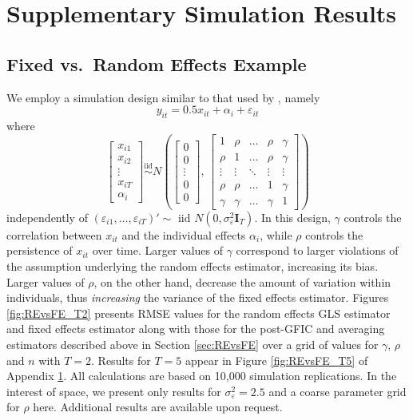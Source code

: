 \section{Supplementary Simulation Results}
\label{sec:simulation_supplement}
\subsection{Fixed vs.\ Random Effects Example}
\label{sec:REvsFEsim}
We employ a simulation design similar to that used by \cite{GuggenbergerRE}, namely
\begin{equation*}
  y_{it} = 0.5 x_{it} + \alpha_i + \varepsilon_{it}
\end{equation*}
where
\[
  \begin{bmatrix}
x_{i1}\\
x_{i2}\\
\vdots\\
x_{iT}\\
\alpha_i
\end{bmatrix}  \overset{\mbox{iid}}{\sim} N \left (
\begin{bmatrix}
0\\
0\\
\vdots\\
0\\
0
\end{bmatrix} , \, 
\begin{bmatrix}
1 & \rho & \ldots & \rho & \gamma\\
\rho & 1 & \ldots & \rho & \gamma\\
\vdots & \vdots&  \ddots & \vdots &\vdots\\
\rho & \rho & \ldots & 1 & \gamma\\
\gamma& \gamma &\ldots& \gamma & 1 
\end{bmatrix}
\right)
\]
independently of $\left( \varepsilon_{i1}, \dots, \varepsilon_{iT} \right)' \sim \mbox{ iid } N(0, \sigma_{\varepsilon}^2 \mathbf{I}_T)$.
In this design, $\gamma$ controls the correlation between $x_{it}$ and the individual effects $\alpha_i$, while $\rho$ controls the persistence of $x_{it}$ over time.
Larger values of $\gamma$ correspond to larger violations of the assumption underlying the random effects estimator, increasing its bias.
Larger values of $\rho$, on the other hand, decrease the amount of variation within individuals, thus \emph{increasing} the variance of the fixed effects estimator. 
Figures \ref{fig:REvsFE_T2} presents RMSE values for the random effects GLS estimator and fixed effects estimator along with those for the post-GFIC and averaging estimators described above in Section \ref{sec:REvsFE} over a grid of values for $\gamma$, $\rho$ and $n$ with $T=2$.
Results for $T=5$ appear in Figure \ref{fig:REvsFE_T5} of Appendix \ref{sec:simulation_supplement}.
All calculations are based on 10,000 simulation replications.
In the interest of space, we present only results for $\sigma_{\varepsilon}^2 = 2.5$ and a coarse parameter grid for $\rho$ here. 
Additional results are available upon request.
 

